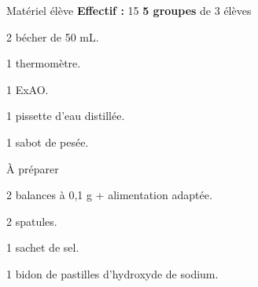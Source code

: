 
\begin{boiteMateriel}{Matériel élève}
  \textbf{Effectif :} 15
  \qq{}\qq{}
  \flecheLongue \textbf{5 groupes} de 3 élèves
  
  \begin{protocole}
    \item 2 bécher de 50 mL.
    \item 1 thermomètre.
    \item 1 ExAO.
    \item 1 pissette d'eau distillée.
    \item 1 sabot de pesée.
  \end{protocole}
\end{boiteMateriel}


\begin{boiteMateriel}{À préparer}
  \begin{protocole}
    \item 2 balances à 0,1 g + alimentation adaptée.
    \item 2 spatules.
    \item 1 sachet de sel.
    \item 1 bidon de pastilles d'hydroxyde de sodium.
  \end{protocole}
\end{boiteMateriel}